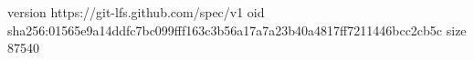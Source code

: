 version https://git-lfs.github.com/spec/v1
oid sha256:01565e9a14ddfc7bc099fff163c3b56a17a7a23b40a4817ff7211446bcc2cb5c
size 87540
